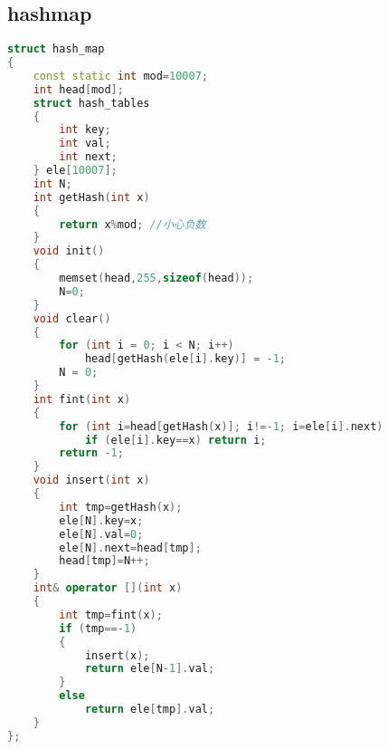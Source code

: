 \subsection{hashmap}
	\begin{lstlisting}[language=c++]
struct hash_map
{
	const static int mod=10007;
	int head[mod];
	struct hash_tables
	{
		int key;
		int val;
		int next;
	} ele[10007];
	int N;
	int getHash(int x)
	{
		return x%mod; //小心负数
	}
	void init()
	{
		memset(head,255,sizeof(head));
		N=0;
	}
	void clear()
	{
		for (int i = 0; i < N; i++)
			head[getHash(ele[i].key)] = -1;
		N = 0;
	}
	int fint(int x)
	{
		for (int i=head[getHash(x)]; i!=-1; i=ele[i].next)
			if (ele[i].key==x) return i;
		return -1;
	}
	void insert(int x)
	{
		int tmp=getHash(x);
		ele[N].key=x;
		ele[N].val=0;
		ele[N].next=head[tmp];
		head[tmp]=N++;
	}
	int& operator [](int x)
	{
		int tmp=fint(x);
		if (tmp==-1)
		{
			insert(x);
			return ele[N-1].val;
		}
		else
			return ele[tmp].val;
	}
};
	\end{lstlisting}

